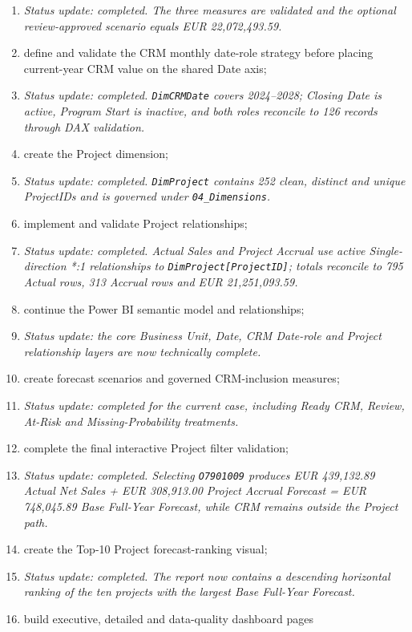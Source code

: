 \documentclass[11pt,a4paper]{article}
\begin{document}
\begin{enumerate}[leftmargin=9mm,itemsep=4pt]
    \item[] \textit{Status update: completed. The three measures are validated and
    the optional review-approved scenario equals EUR 22,072,493.59.}
    \item define and validate the CRM monthly date-role strategy before placing
    current-year CRM value on the shared Date axis;
    \item[] \textit{Status update: completed. \texttt{DimCRMDate} covers
    2024--2028; Closing Date is active, Program Start is inactive, and both roles
    reconcile to 126 records through DAX validation.}
    \item create the Project dimension;
    \item[] \textit{Status update: completed. \texttt{DimProject} contains 252 clean,
    distinct and unique ProjectIDs and is governed under \texttt{04\_Dimensions}.}
    \item implement and validate Project relationships;
    \item[] \textit{Status update: completed. Actual Sales and Project Accrual use
    active Single-direction *:1 relationships to \texttt{DimProject[ProjectID]};
    totals reconcile to 795 Actual rows, 313 Accrual rows and EUR 21,251,093.59.}
    \item continue the Power BI semantic model and relationships;
    \item[] \textit{Status update: the core Business Unit, Date, CRM Date-role and
    Project relationship layers are now technically complete.}
    \item create forecast scenarios and governed CRM-inclusion measures;
    \item[] \textit{Status update: completed for the current case, including Ready CRM,
    Review, At-Risk and Missing-Probability treatments.}
    \item complete the final interactive Project filter validation;
    \item[] \textit{Status update: completed. Selecting \texttt{O7901009} produces
    EUR 439,132.89 Actual Net Sales + EUR 308,913.00 Project Accrual Forecast =
    EUR 748,045.89 Base Full-Year Forecast, while CRM remains outside the Project path.}
    \item create the Top-10 Project forecast-ranking visual;
    \item[] \textit{Status update: completed. The report now contains a descending
    horizontal ranking of the ten projects with the largest Base Full-Year Forecast.}
    \item build executive, detailed and data-quality dashboard pages

\end{enumerate}
\end{document}
